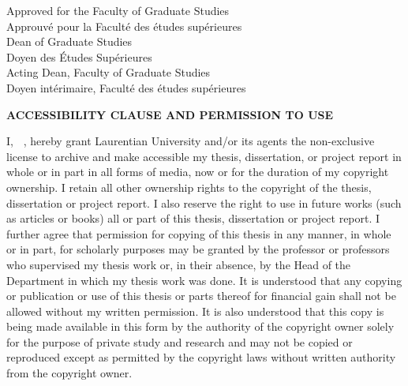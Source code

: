 \begin{minipage}[c]{0.5\textwidth}
    \vspace{2em}
    Approved for the Faculty of Graduate Studies \\
    Approuv\'e pour la Facult\'e des \'etudes sup\'erieures \\
    Dean of Graduate Studies \\
    Doyen des \'Etudes Sup\'erieures \\
    Acting Dean, Faculty of Graduate Studies \\
    Doyen int\'erimaire, Facult\'e des \'etudes sup\'erieures\\
    \vspace{2em}
\end{minipage}
\vspace{-2.0\parskip}
\begin{center}
    \textbf{ACCESSIBILITY CLAUSE AND PERMISSION TO USE} \\
\end{center}
\vspace{-\parskip}
I, \textbf{\givenname\ \surname}, hereby grant Laurentian University and/or its agents the non-exclusive license to archive and make accessible my thesis, dissertation, or project report in whole or in part in all forms of media, now or for the duration of my copyright ownership.
I retain all other ownership rights to the copyright of the thesis, dissertation or project report.
I also reserve the right to use in future works (such as articles or books) all or part of this thesis, dissertation or project report.
I further agree that permission for copying of this thesis in any manner, in whole or in part, for scholarly purposes may be granted by the professor or professors who supervised my thesis work or, in their absence, by the Head of the Department in which my thesis work was done.
It is understood that any copying or publication or use of this thesis or parts thereof for financial gain shall not be allowed without my written permission.
It is also understood that this copy is being made available in this form by the authority of the copyright owner solely for the purpose of private study and research and may not be copied or reproduced except as permitted by the copyright laws without written authority from the copyright owner.

\normalsize